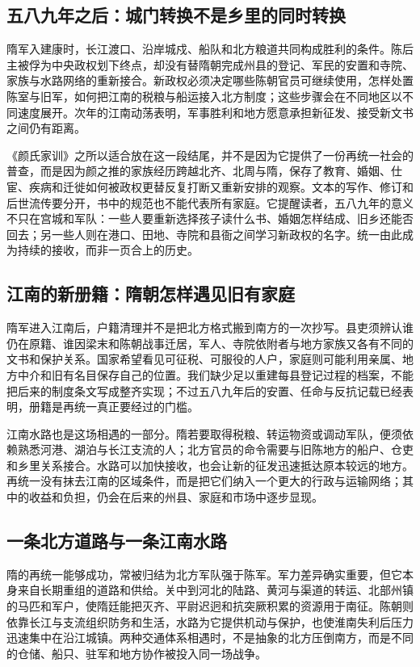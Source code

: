 \subsection{五八九年之后：城门转换不是乡里的同时转换}

隋军入建康时，长江渡口、沿岸城戍、船队和北方粮道共同构成胜利的条件。陈后主被俘为中央政权划下终点，却没有替隋朝完成州县的登记、军民的安置和寺院、家族与水路网络的重新接合。新政权必须决定哪些陈朝官员可继续使用，怎样处置陈室与旧军，如何把江南的税粮与船运接入北方制度；这些步骤会在不同地区以不同速度展开。次年的江南动荡表明，军事胜利和地方愿意承担新征发、接受新文书之间仍有距离。

《颜氏家训》之所以适合放在这一段结尾，并不是因为它提供了一份再统一社会的普查，而是因为颜之推的家族经历跨越北齐、北周与隋，保存了教育、婚姻、仕宦、疾病和迁徙如何被政权更替反复打断又重新安排的观察。文本的写作、修订和后世流传要分开，书中的规范也不能代表所有家庭。它提醒读者，五八九年的意义不只在宫城和军队：一些人要重新选择孩子读什么书、婚姻怎样结成、旧乡还能否回去；另一些人则在港口、田地、寺院和县衙之间学习新政权的名字。统一由此成为持续的接收，而非一页合上的历史。

\subsection{江南的新册籍：隋朝怎样遇见旧有家庭}

隋军进入江南后，户籍清理并不是把北方格式搬到南方的一次抄写。县吏须辨认谁仍在原籍、谁因梁末和陈朝战事迁居，军人、寺院依附者与地方家族又各有不同的文书和保护关系。国家希望看见可征税、可服役的人户，家庭则可能利用亲属、地方中介和旧有名目保存自己的位置。我们缺少足以重建每县登记过程的档案，不能把后来的制度条文写成整齐实现；不过五八九年后的安置、任命与反抗记载已经表明，册籍是再统一真正要经过的门槛。

江南水路也是这场相遇的一部分。隋若要取得税粮、转运物资或调动军队，便须依赖熟悉河港、湖泊与长江支流的人；北方官员的命令需要与旧陈地方的船户、仓吏和乡里关系接合。水路可以加快接收，也会让新的征发迅速抵达原本较远的地方。再统一没有抹去江南的区域条件，而是把它们纳入一个更大的行政与运输网络；其中的收益和负担，仍会在后来的州县、家庭和市场中逐步显现。

\subsection{一条北方道路与一条江南水路}

隋的再统一能够成功，常被归结为北方军队强于陈军。军力差异确实重要，但它本身来自长期重组的道路和供给。关中到河北的陆路、黄河与渠道的转运、北部州镇的马匹和军户，使隋廷能把灭齐、平尉迟迥和抗突厥积累的资源用于南征。陈朝则依靠长江与支流组织防务和生活，水路为它提供机动与保护，也使淮南失利后压力迅速集中在沿江城镇。两种交通体系相遇时，不是抽象的北方压倒南方，而是不同的仓储、船只、驻军和地方协作被投入同一场战争。

